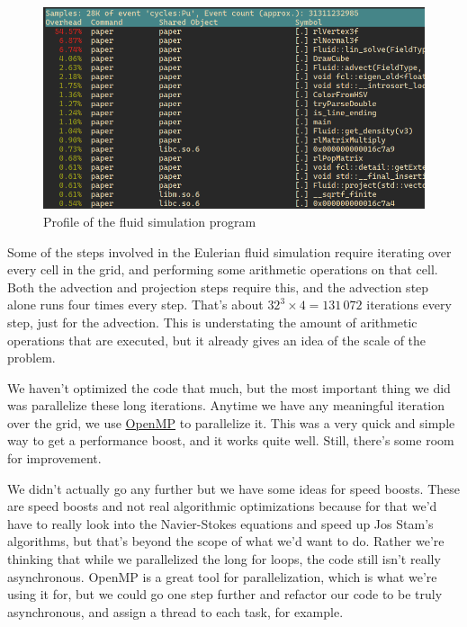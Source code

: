 \documentclass[a4paper,12pt,titlepage]{article}
\begin{document}
\begin{figure}[H]
	\centering
	\includegraphics[width=\textwidth]{resources/profile.png}
	\caption{Profile of the fluid simulation program}
\end{figure}

Some of the steps involved in the Eulerian fluid simulation require iterating
over every cell in the grid, and performing some arithmetic operations on that cell.
Both the advection and projection steps require this, and the advection step
alone runs four times every step. That's about $32^3 \times 4 = 131\,072$ iterations
every step, just for the advection. This is understating the amount of arithmetic
operations that are executed, but it already gives an idea of the scale of the
problem.

We haven't optimized the code that much, but the most important thing we did was
parallelize these long iterations. Anytime we have any meaningful iteration
over the grid, we use \href{www.openmp.org}{OpenMP} to parallelize it. This was
a very quick and simple way to get a performance boost, and it works quite well.
Still, there's some room for improvement.

We didn't actually go any further but we have some ideas for speed boosts. These
are speed boosts and not real algorithmic optimizations because for that we'd have
to really look into the Navier-Stokes equations and speed up Jos Stam's algorithms,
but that's beyond the scope of what we'd want to do. Rather we're thinking that
while we parallelized the long for loops, the code still isn't really asynchronous.
OpenMP is a great tool for parallelization, which is what we're using it for,
but we could go one step further and refactor our code to be truly asynchronous,
and assign a thread to each task, for example.
\end{document}
